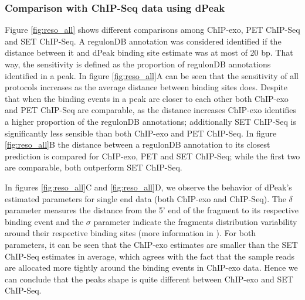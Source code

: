 \documentclass{bmcart}\usepackage[]{graphicx}\usepackage[]{color}
\begin{document}
\subsubsection{Comparison with ChIP-Seq data using dPeak}
\label{sec:dpeak_analysis}



Figure \ref{fig:reso_all} shows different comparisons among ChIP-exo,
PET ChIP-Seq and SET ChIP-Seq. A regulonDB annotation was considered
identified if the distance between it and dPeak binding site estimate
was at most of 20 bp. That way, the sensitivity is defined as
the proportion of regulonDB annotations identified in a peak. In
figure \ref{fig:reso_all}A can be seen that the sensitivity of all
protocols increases as the average distance between binding sites
does. Despite that when the binding events in a peak are closer to
each other both ChIP-exo and PET ChIP-Seq are comparable, as the
distance increases ChIP-exo identifies a higher proportion of the
regulonDB annotations; additionally SET ChIP-Seq is significantly less
sensible than both ChIP-exo and PET ChIP-Seq. In figure
\ref{fig:reso_all}B the distance between a regulonDB annotation to its
closest prediction is compared for ChIP-exo, PET and SET ChIP-Seq;
while the first two are comparable, both outperform SET
ChIP-Seq. 

In figures \ref{fig:reso_all}C and \ref{fig:reso_all}D, we observe the
behavior of dPeak's estimated parameters for single end data (both
ChIP-exo and ChIP-Seq). The $\delta$ parameter measures the distance
from the 5' end of the fragment to its respective binding event and
the $\sigma$ parameter indicate the fragments distribution
variability around their respective binding sites (more information in
\cite{dpeak}). For both parameters, it can be seen that the ChIP-exo
estimates are smaller than the SET ChIP-Seq estimates in average,
which agrees with the fact that the sample reads are allocated more
tightly around the binding events in ChIP-exo data. Hence we can
conclude that the peaks shape is quite different between ChIP-exo and
SET ChIP-Seq.
\end{document}
